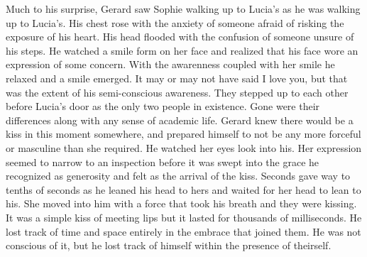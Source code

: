 

Much to his surprise, Gerard saw Sophie walking up to Lucia's as he
was walking up to Lucia's.  His chest rose with the anxiety of someone
afraid of risking the exposure of his heart.  His head flooded with
the confusion of someone unsure of his steps.  He watched a smile form
on her face and realized that his face wore an expression of some
concern.  With the awarenness coupled with her smile he relaxed and a
smile emerged.  It may or may not have said I love you, but that was
the extent of his semi-conscious awareness.  They stepped up to each
other before Lucia's door as the only two people in existence.  Gone
were their differences along with any sense of academic life.  Gerard
knew there would be a kiss in this moment somewhere, and prepared
himself to not be any more forceful or masculine than she required.
He watched her eyes look into his.  Her expression seemed to narrow to
an inspection before it was swept into the grace he recognized as
generosity and felt as the arrival of the kiss.  Seconds gave way to
tenths of seconds as he leaned his head to hers and waited for her
head to lean to his.  She moved into him with a force that took his
breath and they were kissing.  It was a simple kiss of meeting lips
but it lasted for thousands of milliseconds.  He lost track of time
and space entirely in the embrace that joined them.  He was not
conscious of it, but he lost track of himself within the presence of
theirself.

\bye
